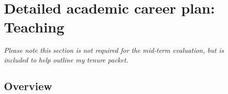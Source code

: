 \chapter{Detailed academic career plan: Teaching}
\label{futureTeaching}

\textit{Please note this section is not required for the mid-term evaluation, but is included to help outline my tenure packet.}

\section{Overview}